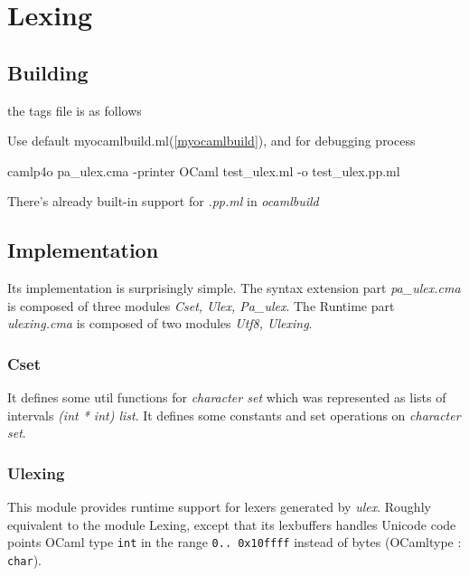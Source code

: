 \section{Lexing}

\subsection{Building}
the tags file is as follows


Use default myocamlbuild.ml(\ref{myocamlbuild}), and for debugging
process

\begin{bashcode}
  camlp4o pa_ulex.cma -printer OCaml test_ulex.ml -o test_ulex.pp.ml
\end{bashcode}
There's already built-in support for \textit{.pp.ml} in
\textit{ocamlbuild}



\subsection{Implementation}
\label{Implementation}
Its implementation is surprisingly simple. The syntax extension part
\textit{pa\_ulex.cma} is composed of three modules \textit{Cset, Ulex,
  Pa\_ulex}. The Runtime part \textit{ulexing.cma} is composed of two
modules \textit{Utf8, Ulexing}.

\subsubsection{Cset}
\label{Cset}

It defines some util functions for \textit{character set} which was
represented as lists of intervals \textit{(int * int) list}. It
defines some constants and set operations on \textit{character set}.

\subsubsection{Ulexing}
\label{Ulexing}
This module provides runtime support for lexers generated by
\textit{ulex}.  Roughly equivalent to the module Lexing, except that
its lexbuffers handles Unicode code points OCaml type \verb|int| in
the range \verb|0.. 0x10ffff| instead of bytes (OCamltype :
\verb|char|).

